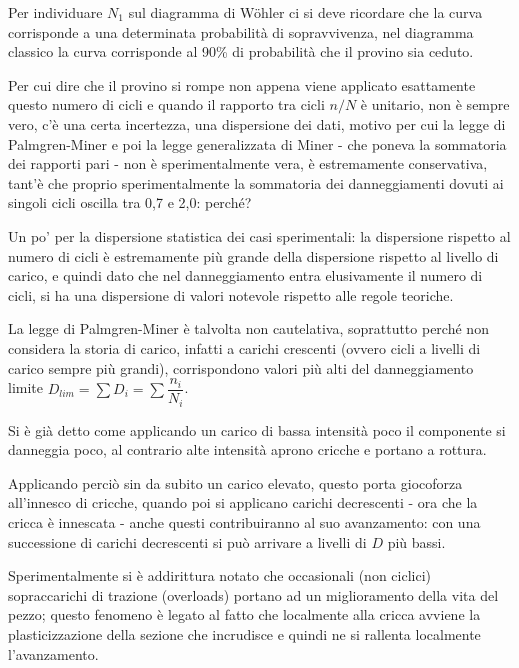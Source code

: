 \documentclass{article}
\begin{document}
\begin{adjustwidth}{2in}{}
			 Per individuare $N_1$ sul diagramma di Wöhler ci si deve ricordare che la curva corrisponde a una determinata probabilità di sopravvivenza, nel diagramma classico la curva corrisponde al 90\% di probabilità che il provino sia ceduto. \newline 
			 
			 Per cui dire che il provino si rompe non appena viene applicato esattamente questo numero di cicli e quando il rapporto tra cicli $n/N$ è unitario, non è sempre vero, c'è una certa incertezza, una dispersione dei dati, motivo per cui la legge di Palmgren-Miner e poi la legge generalizzata di Miner - che poneva la sommatoria dei rapporti pari - non è sperimentalmente vera, è estremamente conservativa, tant'è che proprio sperimentalmente  la sommatoria dei danneggiamenti dovuti ai singoli cicli oscilla tra 0,7 e 2,0: perché? 
			 
			 Un po' per la dispersione statistica dei casi sperimentali: la dispersione rispetto al numero di cicli è estremamente più grande della dispersione rispetto al livello di carico, e quindi dato che nel danneggiamento entra elusivamente il numero di cicli, si ha una dispersione di valori notevole rispetto alle regole teoriche. 
			 
			 La legge di Palmgren-Miner è talvolta non cautelativa, soprattutto perché non considera la storia di carico, infatti a carichi crescenti (ovvero cicli a livelli di carico sempre più grandi), corrispondono valori più alti del danneggiamento limite $D_{lim} = \sum D_i = \sum \dfrac{n_i}{N_i}$. \newpage
			 
			 Si è già detto come applicando un carico di bassa intensità poco il componente si danneggia poco, al contrario alte intensità aprono cricche e portano a rottura. 
			 
			 Applicando perciò sin da subito un carico elevato, questo porta giocoforza all'innesco di cricche, quando poi si applicano carichi decrescenti - ora che la cricca è innescata -  anche questi contribuiranno al suo avanzamento: con una successione di carichi decrescenti si può arrivare a livelli di $D$ più bassi. 
			 
			 Sperimentalmente si è addirittura notato che occasionali (non ciclici) sopraccarichi di trazione (overloads) portano ad un miglioramento della vita del pezzo; questo fenomeno è legato al fatto che localmente alla cricca avviene la plasticizzazione della sezione che incrudisce e quindi ne si rallenta localmente l'avanzamento. \newline
			 

\end{adjustwidth}
\end{document}
